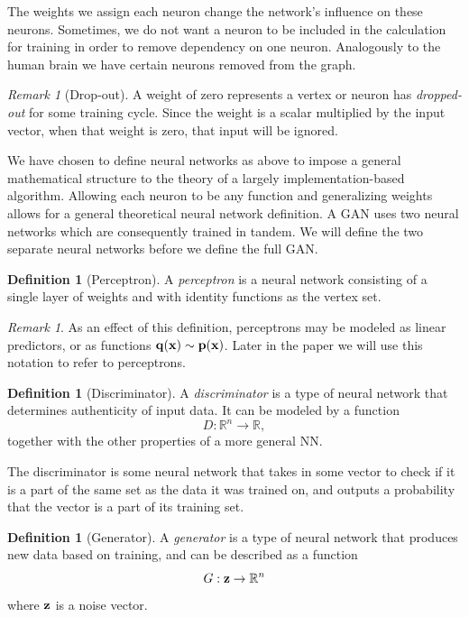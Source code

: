 \documentclass[12pt]{amsart}
\newcommand{\RR}{{\mathbb R}}
\newcommand{\bfx}{{\bf x}}
\theoremstyle{definition}
\newtheorem{definition}[theorem]{Definition}
\theoremstyle{remark}
\newtheorem{remark}[theorem]{Remark}
\begin{document}
The weights we assign each neuron change the network's influence on these neurons. Sometimes, we do not want a neuron to be included in the calculation for training in order to remove dependency on one
neuron. Analogously to the human brain we have certain neurons removed from the graph.

\begin{remark}[Drop-out]
        A weight of zero represents a vertex or neuron has {\em dropped-out} for some training cycle.
        Since the weight is a scalar multiplied by the input vector, when that weight is
        zero, that input will be ignored.
\end{remark}

We have chosen to define neural networks as above to impose a general mathematical structure to the theory of a largely 
implementation-based algorithm. Allowing each neuron to be any function and generalizing weights allows for a general
theoretical neural network definition. A GAN uses two neural networks which are consequently trained in tandem. We will
define the two separate neural networks before we define the full GAN.

\begin{definition}[Perceptron]
        A {\em perceptron} is a neural network consisting of a single layer of weights and
        with identity functions as the vertex set.
\end{definition}

\begin{remark}
        As an effect of this definition, perceptrons may be modeled as linear predictors,
        or as functions ${\bf q}(\bfx)\sim {\bf p}(\bfx)$. Later in the paper we
        will use this notation to refer to perceptrons.
\end{remark}

\begin{definition}[Discriminator]
        A {\em discriminator} is a type of neural network that determines authenticity of input data. It can be
        modeled by a function 
        $$ D:\RR^n \to \RR, $$ together with the other properties of a more general NN.
\end{definition}

The discriminator is some neural network that takes in some vector to check if 
it is a part of the same set as the data it was trained on, and outputs a probability that the
vector is a part of its training set.


\begin{definition}[Generator]
        A {\em generator} is a type of neural network that produces
        new data based on training, and can be described as a function
        $$ G:{\bf z} \to \RR^n $$
        where ${\bf z}$ is a noise vector.
\end{definition}
\end{document}
